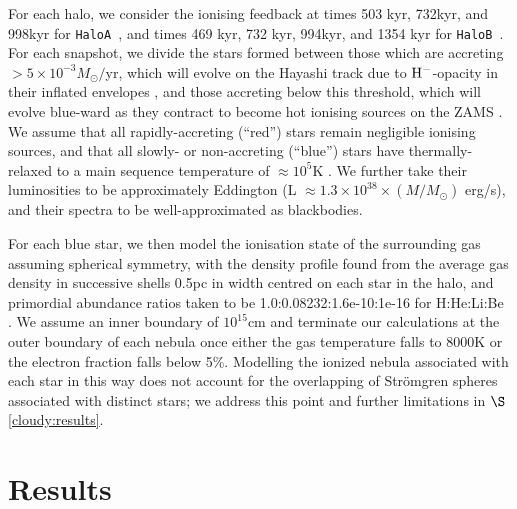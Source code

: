\documentclass[graphics, twocolumn, usenatbib]{mn2e}
\newcommand{\ha} {\texttt{HaloA~}}
\newcommand{\hb} {\texttt{HaloB~}}
\begin{document}
For each halo, we consider the ionising feedback at times 503 kyr, 732kyr, and 998kyr for \ha, and times 469 kyr, 732 kyr, 994kyr, and 1354 kyr for \hb. For each snapshot, we divide the stars formed between those which are accreting $> 5 \times 10^{-3} M_{\odot}/$yr, which will evolve on the Hayashi track due to $\rm{H}^{-}$-opacity in their inflated envelopes \citep[e.g.,][]{Hosokawa_2013}, and those accreting below this threshold, which will evolve blue-ward as they contract to become hot ionising sources on the ZAMS \citep{Haemmerle_2017}. We assume that all rapidly-accreting (``red'') stars remain negligible ionising sources, and that all slowly- or non-accreting (``blue'') stars have thermally-relaxed to a main sequence temperature of $\approx 10^{5}$K \citep{Schaerer_2002, Woods_2020}. We further take their luminosities to be approximately Eddington (L $\approx 1.3\times 10^{38} \times (M/M_{\odot})$ erg/s), and their spectra to be well-approximated as blackbodies.

For each blue star, we then model the ionisation state of the surrounding gas assuming spherical symmetry, with the density profile found from the average gas density in successive shells 0.5pc in width centred on each star in the halo, and primordial abundance ratios taken to be 1.0:0.08232:1.6e-10:1e-16 for H:He:Li:Be \citep[consistent with the results of the][table 2, see {\sc cloudy} documentation for further discussion]{Planck_2014}. We assume an inner boundary of $10^{15}$cm and terminate our calculations at the outer boundary of each nebula once either the gas temperature falls to 8000K or the electron fraction falls below 5\%. Modelling the ionized nebula associated with each star in this way does not account for the overlapping of Str{\"o}mgren spheres associated with distinct stars; we address this point and further limitations in $\S$\ref{cloudy:results}.


\section{Results}
\end{document}
